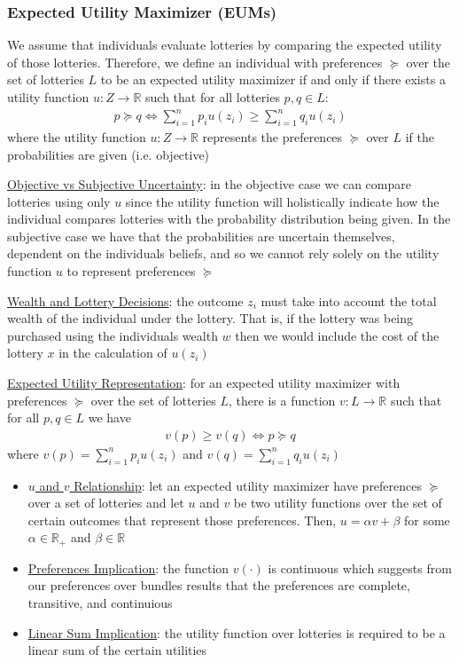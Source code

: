 \documentclass{article}
\begin{document}
\subsubsection{Expected Utility Maximizer (EUMs)}
We assume that individuals evaluate lotteries by comparing the expected utility of those lotteries. Therefore, we define an individual with preferences $\succeq$ over the set of lotteries $L$ to be an expected utility maximizer if and only if there exists a utility function $u: Z \rightarrow \mathbb{R}$ such that for all lotteries $p,q \in L$:
\begin{gather*}
  p \succeq q \Leftrightarrow \sum_{i=1}^{n} p_{i}u(z_{i}) \geq \sum_{i=1}^{n} q_{i}u(z_{i})
\end{gather*}
where the utility function $u: Z \rightarrow \mathbb{R}$ represents the preferences $\succeq$ over $L$ if the probabilities are given (i.e. objective)
\par \vspace{0.3em}
  \underline{Objective vs Subjective Uncertainty}: in the objective case we can compare lotteries using only $u$ since the utility function will holistically indicate how the individual compares lotteries with the probability distribution being given. In the subjective case we have that the probabilities are uncertain themselves, dependent on the individuals beliefs, and so we cannot rely solely on the utility function $u$ to represent preferences $\succeq$
  \par
  \underline{Wealth and Lottery Decisions}: the outcome $z_{i}$ must take into account the total wealth of the individual under the lottery. That is, if the lottery was being purchased using the individuals wealth $w$ then we would include the cost of the lottery $x$ in the calculation of $u(z_{i})$
  \par
  \underline{Expected Utility Representation}: for an expected utility maximizer with preferences $\succeq$ over the set of lotteries $L$, there is a function $v: L \rightarrow \mathbb{R}$ such that for all $p,q \in L$ we have
  \begin{gather*}
    v(p) \geq v(q) \Leftrightarrow  p \succeq q
  \end{gather*}
  where $v(p) = \sum_{i=1}^{n} p_{i}u(z_{i})$ and $v(q) = \sum_{i=1}^{n} q_{i}u(z_{i})$
  \begin{itemize}
    \item  \underline{$u$ and $v$ Relationship}: let an expected utility maximizer have preferences $\succeq$ over a set of lotteries and let $u$ and $v$ be two utility functions over the set of certain outcomes that represent those preferences. Then, $u = \alpha v + \beta$ for some $\alpha \in \mathbb{R}_{+}$ and $\beta \in \mathbb{R}$
    \item  \underline{Preferences Implication}: the function $v(\cdot)$ is continuous which suggests from our preferences over bundles results that the preferences are complete, transitive, and continuious
    \item  \underline{Linear Sum Implication}: the utility function over lotteries is required to be a linear sum of the certain utilities
  \end{itemize}
\end{document}
